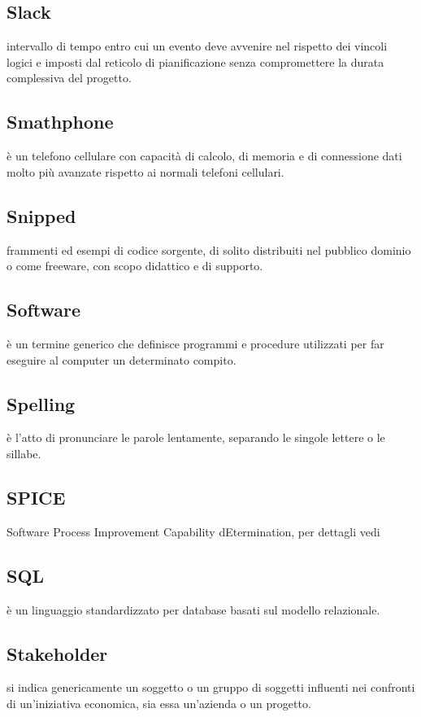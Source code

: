 \documentclass[12pt,a4paper]{article}
\begin{document}
\subsection{Slack} 
intervallo di tempo entro cui un evento deve avvenire nel rispetto dei vincoli logici e imposti dal reticolo di pianificazione senza compromettere la durata complessiva del progetto.

\subsection{Smathphone} 
è un telefono cellulare con capacità di calcolo, di memoria e di connessione dati molto più avanzate rispetto ai normali telefoni cellulari.

\subsection{Snipped} 
frammenti ed esempi di codice sorgente, di solito distribuiti nel pubblico dominio o come freeware, con scopo didattico e di supporto.

\subsection{Software} 
è un termine generico che definisce programmi e procedure utilizzati per far eseguire al computer un determinato compito.

\subsection{Spelling} 
è l'atto di pronunciare le parole lentamente, separando le singole lettere o le sillabe.

\subsection{SPICE} 
 Software Process Improvement Capability
dEtermination, per dettagli vedi \PdQ

\subsection{SQL} 
è un linguaggio standardizzato per database basati sul modello relazionale.

\subsection{Stakeholder} 
si indica genericamente un soggetto o un gruppo di soggetti influenti nei confronti di un'iniziativa economica, sia essa un'azienda o un progetto.
\end{document}
